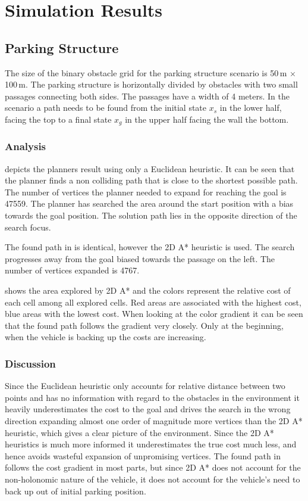 \section{Simulation Results}

\subsection{Parking Structure}
The size of the binary obstacle grid for the parking structure scenario is 50\,m $\times$ 100\,m. The parking structure is horizontally divided by obstacles with two small passages connecting both sides. The passages have a width of 4 meters. In the scenario a path needs to be found from the initial state $x_s$ in the lower half, facing the top to a final state $x_g$ in the upper half facing the wall the bottom.

\subsubsection{Analysis}
 depicts the planners result using only a Euclidean heuristic. It can be seen that the planner finds a non colliding path that is close to the shortest possible path. The number of vertices the planner needed to expand for reaching the goal is 47559. The planner has searched the area around the start position with a bias towards the goal position. The solution path lies in the opposite direction of the search focus.

The found path in  is identical, however the 2D A* heuristic is used. The search progresses away from the goal biased towards the passage on the left. The number of vertices expanded is 4767.

 shows the area explored by 2D A* and the colors represent the relative cost of each cell among all explored cells. Red areas are associated with the highest cost, blue areas with the lowest cost. When looking at the color gradient it can be seen that the found path follows the gradient very closely. Only at the beginning, when the vehicle is backing up the costs are increasing. 

\subsubsection{Discussion}
Since the Euclidean heuristic only accounts for relative distance between two points and has no information with regard to the obstacles in the environment it heavily underestimates the cost to the goal and drives the search in the wrong direction expanding almost one order of magnitude more vertices than the 2D A* heuristic, which gives a clear picture of the environment. Since the 2D A* heuristics is much more informed it underestimates the true cost much less, and hence avoids wasteful expansion of unpromising vertices. The found path in  follows the cost gradient in most parts, but since 2D A* does not account for the non-holonomic nature of the vehicle, it does not account for the vehicle's need to back up out of initial parking position.

